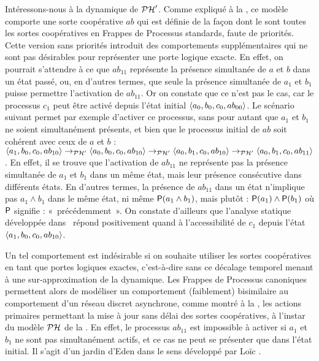 \begin{example}
  Intéressons-nous à la dynamique de $\PH'$.
  Comme expliqué à la ,
  ce modèle comporte une sorte coopérative $ab$ qui est définie de la façon
  dont le sont toutes les sortes coopératives
  en Frappes de Processus standards, faute de priorités.
  Cette version sans priorités introduit des comportements supplémentaires qui ne sont pas
  désirables pour représenter une porte logique exacte.
  En effet, on pourrait s'attendre à ce que $ab_{11}$ représente la présence simultanée
  de $a$ et $b$ dans un état passé,
  ou, en d'autres termes, que seule la présence simultanée de $a_1$ et $b_1$ puisse
  permettre l'activation de $ab_{11}$.
  Or on constate que ce n'est pas le cas, car le processus $c_1$ peut être
  activé depuis l'état initial $\etat{a_0, b_0, c_0, ab_{00}}$.
  Le scénario suivant permet par exemple d'activer
  ce processus, sans pour autant que $a_1$ et $b_1$ ne soient simultanément présents,
  et bien que le processus initial de $ab$ soit cohérent avec ceux de $a$ et $b$ :
  $\PHstate{a_1, b_0, c_0, ab_{10}} \PHtrans[\PH']
  \PHstate{a_0, b_0, c_0, ab_{10}} \PHtrans[\PH']
  \PHstate{a_0, b_1, c_0, ab_{10}} \PHtrans[\PH']
  \PHstate{a_0, b_1, c_0, ab_{11}}$.
  En effet, il se trouve que l'activation de $ab_{11}$ ne représente pas la présence simultanée
  de $a_1$ et $b_1$ dans un même état, mais leur présence consécutive dans
  différents états.
  En d'autres termes, la présence de $ab_{11}$ dans un état n'implique pas
  $a_1 \wedge b_1$ dans le même état, ni même
  $\tempop(a_1 \wedge b_1)$, mais plutôt : $\tempop(a_1) \wedge \tempop(b_1)$
  où $\tempop$ signifie : «~précédemment~».
  On constate d'ailleurs que l'analyse statique développée dans~\cite{PMR12-MSCS}
  répond positivement quand à l'accessibilité de $c_1$ depuis l'état
  $\PHstate{a_1, b_0, c_0, ab_{10}}$.
  
  Un tel comportement est indésirable si on souhaite utiliser les sortes coopératives en tant
  que portes logiques exactes, c'est-à-dire sans ce décalage temporel menant à une sur-approximation
  de la dynamique.
  Les Frappes de Processus canoniques permettent alors de modéliser un comportement (faiblement)
  bisimilaire au comportement d'un réseau discret asynchrone,
  comme montré à la ,
  les actions primaires permettant la mise à jour
  sans délai des sortes coopératives, à l'instar du modèle $\PH$ de la .
  En effet, le processus $ab_{11}$ est impossible à activer si $a_1$ et $b_1$ ne sont
  pas simultanément actifs, et ce cas ne peut se présenter que dans l'état initial.
  Il s'agit d'un jardin d'Eden dans le sens développé par
  Loïc \cite[p.~123]{Pauleve11}.
  

\end{example}

